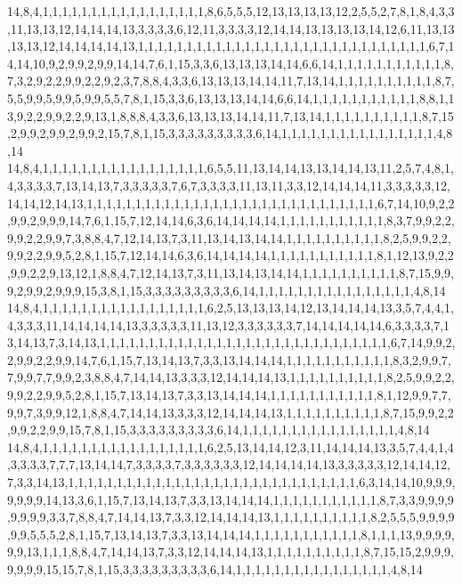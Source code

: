 14,8,4,1,1,1,1,1,1,1,1,1,1,1,1,1,1,1,1,1,8,6,5,5,5,12,13,13,13,13,12,2,5,5,2,7,8,1,8,4,3,3,11,13,13,12,14,14,14,13,3,3,3,3,6,12,11,3,3,3,3,12,14,14,13,13,13,13,14,12,6,11,13,13,13,13,12,14,14,14,14,13,1,1,1,1,1,1,1,1,1,1,1,1,1,1,1,1,1,1,1,1,1,1,1,1,1,1,1,1,1,1,6,7,14,14,10,9,2,9,9,2,9,9,14,14,7,6,1,15,3,3,6,13,13,13,14,14,6,6,14,1,1,1,1,1,1,1,1,1,1,1,8,7,3,2,9,2,2,9,9,2,2,9,2,3,7,8,8,4,3,3,6,13,13,13,14,14,11,7,13,14,1,1,1,1,1,1,1,1,1,1,8,7,5,5,9,9,5,9,9,5,9,9,5,5,7,8,1,15,3,3,6,13,13,13,14,14,6,6,14,1,1,1,1,1,1,1,1,1,1,1,8,8,1,13,9,2,2,9,9,2,2,9,13,1,8,8,8,4,3,3,6,13,13,13,14,14,11,7,13,14,1,1,1,1,1,1,1,1,1,1,8,7,15,2,9,9,2,9,9,2,9,9,2,15,7,8,1,15,3,3,3,3,3,3,3,3,3,6,14,1,1,1,1,1,1,1,1,1,1,1,1,1,1,1,1,4,8,14
14,8,4,1,1,1,1,1,1,1,1,1,1,1,1,1,1,1,1,1,6,5,5,11,13,14,14,13,13,14,14,13,11,2,5,7,4,8,1,4,3,3,3,3,7,13,14,13,7,3,3,3,3,3,7,6,7,3,3,3,3,11,13,11,3,3,12,14,14,14,11,3,3,3,3,3,12,14,14,12,14,13,1,1,1,1,1,1,1,1,1,1,1,1,1,1,1,1,1,1,1,1,1,1,1,1,1,1,1,1,1,1,6,7,14,10,9,2,2,9,9,2,9,9,9,14,7,6,1,15,7,12,14,14,6,3,6,14,14,14,14,1,1,1,1,1,1,1,1,1,1,1,8,3,7,9,9,2,2,9,9,2,2,9,9,7,3,8,8,4,7,12,14,13,7,3,11,13,14,13,14,14,1,1,1,1,1,1,1,1,1,1,8,2,5,9,9,2,2,9,9,2,2,9,9,5,2,8,1,15,7,12,14,14,6,3,6,14,14,14,14,1,1,1,1,1,1,1,1,1,1,1,8,1,12,13,9,2,2,9,9,2,2,9,13,12,1,8,8,4,7,12,14,13,7,3,11,13,14,13,14,14,1,1,1,1,1,1,1,1,1,1,8,7,15,9,9,9,2,9,9,2,9,9,9,15,3,8,1,15,3,3,3,3,3,3,3,3,3,6,14,1,1,1,1,1,1,1,1,1,1,1,1,1,1,1,1,4,8,14
14,8,4,1,1,1,1,1,1,1,1,1,1,1,1,1,1,1,1,1,6,2,5,13,13,13,14,12,13,14,14,14,13,3,5,7,4,4,1,4,3,3,3,11,14,14,14,14,13,3,3,3,3,3,11,13,12,3,3,3,3,3,3,7,14,14,14,14,14,6,3,3,3,3,7,13,14,13,7,3,14,13,1,1,1,1,1,1,1,1,1,1,1,1,1,1,1,1,1,1,1,1,1,1,1,1,1,1,1,1,1,1,6,7,14,9,9,2,2,9,9,2,2,9,9,14,7,6,1,15,7,13,14,13,7,3,3,13,14,14,14,1,1,1,1,1,1,1,1,1,1,1,8,3,2,9,9,7,7,9,9,7,7,9,9,2,3,8,8,4,7,14,14,13,3,3,3,12,14,14,14,13,1,1,1,1,1,1,1,1,1,1,8,2,5,9,9,2,2,9,9,2,2,9,9,5,2,8,1,15,7,13,14,13,7,3,3,13,14,14,14,1,1,1,1,1,1,1,1,1,1,1,8,1,12,9,9,7,7,9,9,7,3,9,9,12,1,8,8,4,7,14,14,13,3,3,3,12,14,14,14,13,1,1,1,1,1,1,1,1,1,1,8,7,15,9,9,2,2,9,9,2,2,9,9,15,7,8,1,15,3,3,3,3,3,3,3,3,3,6,14,1,1,1,1,1,1,1,1,1,1,1,1,1,1,1,1,4,8,14
14,8,4,1,1,1,1,1,1,1,1,1,1,1,1,1,1,1,1,1,6,2,5,13,14,14,12,3,11,14,14,14,13,3,5,7,4,4,1,4,3,3,3,3,7,7,7,13,14,14,7,3,3,3,3,7,3,3,3,3,3,3,12,14,14,14,14,13,3,3,3,3,3,12,14,14,12,7,3,3,14,13,1,1,1,1,1,1,1,1,1,1,1,1,1,1,1,1,1,1,1,1,1,1,1,1,1,1,1,1,1,1,6,3,14,14,10,9,9,9,9,9,9,9,14,13,3,6,1,15,7,13,14,13,7,3,3,13,14,14,14,1,1,1,1,1,1,1,1,1,1,1,8,7,3,3,9,9,9,9,9,9,9,9,3,3,7,8,8,4,7,14,14,13,7,3,3,12,14,14,14,13,1,1,1,1,1,1,1,1,1,1,8,2,5,5,5,9,9,9,9,9,9,5,5,5,2,8,1,15,7,13,14,13,7,3,3,13,14,14,14,1,1,1,1,1,1,1,1,1,1,1,8,1,1,1,13,9,9,9,9,9,9,13,1,1,1,8,8,4,7,14,14,13,7,3,3,12,14,14,14,13,1,1,1,1,1,1,1,1,1,1,8,7,15,15,2,9,9,9,9,9,9,9,15,15,7,8,1,15,3,3,3,3,3,3,3,3,3,6,14,1,1,1,1,1,1,1,1,1,1,1,1,1,1,1,1,4,8,14
